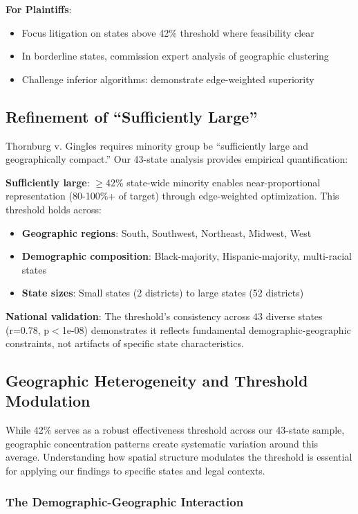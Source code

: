 \textbf{For Plaintiffs}:
\begin{itemize}
    \item Focus litigation on states above 42\% threshold where feasibility clear
    \item In borderline states, commission expert analysis of geographic clustering
    \item Challenge inferior algorithms: demonstrate edge-weighted superiority
\end{itemize}

\subsection{Refinement of ``Sufficiently Large''}

Thornburg v. Gingles requires minority group be ``sufficiently large and geographically compact.'' Our 43-state analysis provides empirical quantification:

\textbf{Sufficiently large}: $\geq$42\% state-wide minority enables near-proportional representation (80-100\%+ of target) through edge-weighted optimization. This threshold holds across:
\begin{itemize}
    \item \textbf{Geographic regions}: South, Southwest, Northeast, Midwest, West
    \item \textbf{Demographic composition}: Black-majority, Hispanic-majority, multi-racial states
    \item \textbf{State sizes}: Small states (2 districts) to large states (52 districts)
\end{itemize}

\textbf{National validation}: The threshold's consistency across 43 diverse states (r=0.78, p$<$1e-08) demonstrates it reflects fundamental demographic-geographic constraints, not artifacts of specific state characteristics.

\subsection{Geographic Heterogeneity and Threshold Modulation}

While 42\% serves as a robust effectiveness threshold across our 43-state sample, geographic concentration patterns create systematic variation around this average. Understanding how spatial structure modulates the threshold is essential for applying our findings to specific states and legal contexts.

\subsubsection{The Demographic-Geographic Interaction}

